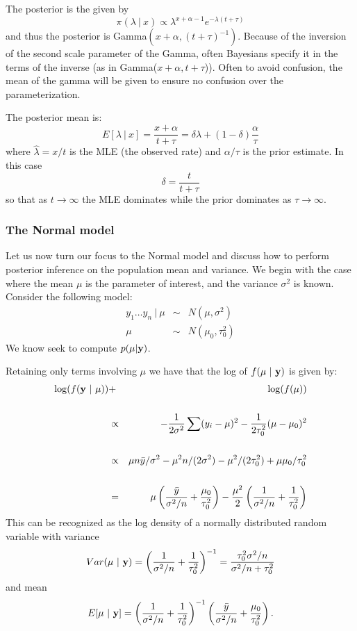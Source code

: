 The posterior is the given by
$$
\pi(\lambda ~|~ x) \propto \lambda^{x + \alpha - 1} e^{-\lambda (t + \tau)} 
$$
and thus the posterior is Gamma$(x + \alpha, (t + \tau)^{-1})$. Because of
the inversion of the second scale parameter of the Gamma, often Bayesians
specify it in the terms of the inverse (as in Gamma($x + \alpha, t + \tau$)). 
Often to avoid confusion, the mean of the gamma will be given to ensure no
confusion over the parameterization.

The posterior mean is:
$$
E[ \lambda ~|~ x]  = \frac{x + \alpha}{t + \tau}
= \delta \hat \lambda + (1 - \delta) \frac{\alpha}{\tau}
$$
where $\hat \lambda = x / t$ is the MLE (the observed rate) and
$\alpha / \tau$ is the prior estimate. In this case 
$$
\delta = \frac{t}{t + \tau}
$$
so that as $t \rightarrow \infty$ the MLE dominates while the prior
dominates as $\tau \rightarrow \infty$. 



\subsubsection{The Normal model}

Let us now turn our focus to the Normal model and discuss how to perform posterior inference on the population mean and variance.
We begin with the case where the mean $\mu$ is the parameter of interest, and the variance $\sigma^2$ is known. 
Consider the following model:
\begin{eqnarray*}
 y_1 \ldots y_n ~|~ \mu &\sim& N(\mu,  \sigma^2 ) \\
\mu &\sim& N(\mu_0, \tau_0^2)
\end{eqnarray*}
We know seek to compute $p(\mu | \mathbf{y})$. 

Retaining only terms involving $\mu$ we have that the log of $f(\mu ~|~ \mathbf{y})$ is given by:
\begin{eqnarray*}
\log(f(\mathbf{y} ~|~ \mu)) &+& \log(f(\mu)) \\
\\
& \propto & -\frac{1}{2\sigma^2} \sum (y_i - \mu)^2   -\frac{1}{2\tau_0^2}(\mu - \mu_0)^2 \\
\\
& \propto & \mu n \bar y / \sigma^2 - \mu^2 n / (2\sigma^2) - \mu^2 / (2\tau_0^2) + \mu \mu_0 / \tau_0^2 \\
\\
& = & \mu \left(
\frac{\bar y}{\sigma^2 / n} + \frac{\mu_0}{\tau_0^2}\right)
- \frac{\mu^2}{2} \left(
\frac{1}{\sigma^2 / n} + \frac{1}{\tau_0^2}
\right)
\end{eqnarray*}
This can be recognized as the log density of a normally distributed random variable with variance
$$
Var(\mu ~|~ \mathbf{y}) =
\left(
\frac{1}{\sigma^2 / n} + \frac{1}{\tau_0^2}
\right)^{-1}
=\frac{\tau_0^2 \sigma^2 / n}{\sigma^2 / n + \tau_0^2}
$$
and mean 
$$
E[\mu ~|~ \mathbf{y}] = \left(
\frac{1}{\sigma^2 / n} + \frac{1}{\tau_0^2}
\right)^{-1}
\left(
\frac{\bar y}{\sigma^2 / n} + \frac{\mu_0}{\tau_0^2}\right).
$$

